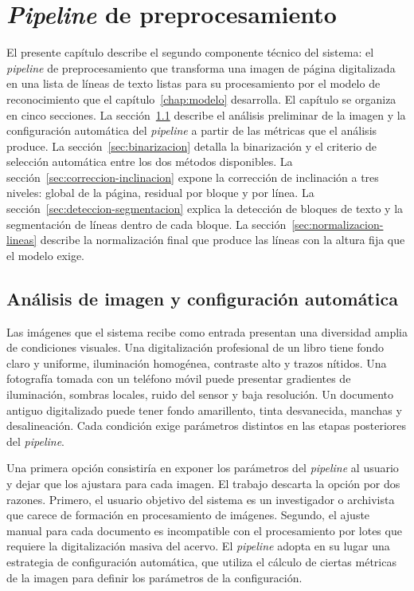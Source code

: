 \setcounter{chapter}{2}

\chapter{\textit{Pipeline} de preprocesamiento}\label{chap:preprocesamiento}

El presente capítulo describe el segundo componente técnico del sistema: el \textit{pipeline} de preprocesamiento que transforma una imagen de página digitalizada en una lista de líneas de texto listas para su procesamiento por el modelo de reconocimiento que el capítulo~\ref{chap:modelo} desarrolla. El capítulo se organiza en cinco secciones. La sección~\ref{sec:analisis-imagen} describe el análisis preliminar de la imagen y la configuración automática del \textit{pipeline} a partir de las métricas que el análisis produce. La sección~\ref{sec:binarizacion} detalla la binarización y el criterio de selección automática entre los dos métodos disponibles. La sección~\ref{sec:correccion-inclinacion} expone la corrección de inclinación a tres niveles: global de la página, residual por bloque y por línea. La sección~\ref{sec:deteccion-segmentacion} explica la detección de bloques de texto y la segmentación de líneas dentro de cada bloque. La sección~\ref{sec:normalizacion-lineas} describe la normalización final que produce las líneas con la altura fija que el modelo exige.

\section{Análisis de imagen y configuración automática}
\label{sec:analisis-imagen}

Las imágenes que el sistema recibe como entrada presentan una diversidad amplia de condiciones visuales. Una digitalización profesional de un libro tiene fondo claro y uniforme, iluminación homogénea, contraste alto y trazos nítidos. Una fotografía tomada con un teléfono móvil puede presentar gradientes de iluminación, sombras locales, ruido del sensor y baja resolución. Un documento antiguo digitalizado puede tener fondo amarillento, tinta desvanecida, manchas y desalineación. Cada condición exige parámetros distintos en las etapas posteriores del \textit{pipeline}.

Una primera opción consistiría en exponer los parámetros del \textit{pipeline} al usuario y dejar que los ajustara para cada imagen. El trabajo descarta la opción por dos razones. Primero, el usuario objetivo del sistema es un investigador o archivista que carece de formación en procesamiento de imágenes. Segundo, el ajuste manual para cada documento es incompatible con el procesamiento por lotes que requiere la digitalización masiva del acervo. El \textit{pipeline} adopta en su lugar una estrategia de configuración automática, que utiliza el cálculo de ciertas métricas de la imagen para definir los parámetros de la configuración.

